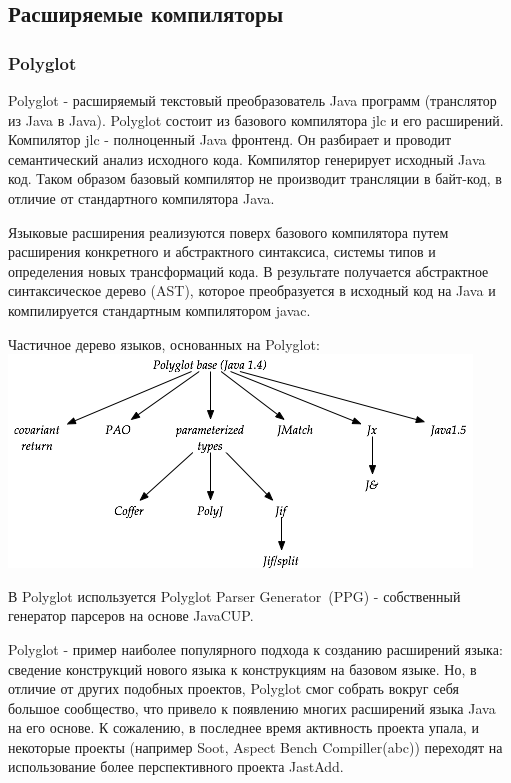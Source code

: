 \documentclass[a4paper,12pt]{article}
\begin{document}
\subsection{Расширяемые компиляторы}
\subsubsection{Polyglot}
Polyglot - расширяемый текстовый преобразователь Java программ (транслятор из
Java в Java). Polyglot состоит из базового компилятора jlc и его расширений.
Компилятор jlc - полноценный Java фронтенд. Он разбирает и проводит
семантический анализ исходного кода. Компилятор генерирует исходный Java код.
Таком образом базовый компилятор не производит трансляции в байт-код, в отличие
от стандартного компилятора Java.

Языковые расширения реализуются поверх базового компилятора путем расширения
конкретного и абстрактного синтаксиса, системы типов и определения новых
трансформаций кода. В результате получается абстрактное синтаксическое дерево
(AST), которое преобразуется в исходный код на Java и компилируется стандартным
компилятором javac.

\begin{center}
Частичное дерево языков, основанных на Polyglot:
 \includegraphics[scale=0.6]{img/polyglot-tree.png}
\end{center}

В Polyglot используется Polyglot Parser Generator~(PPG) - собственный генератор
парсеров на основе JavaCUP.

Polyglot - пример наиболее популярного подхода к созданию расширений языка:
сведение конструкций нового языка к конструкциям на базовом языке. Но, в
отличие от других подобных проектов, Polyglot смог собрать вокруг себя большое
сообщество, что привело к появлению многих расширений языка Java на его основе.
К сожалению, в последнее время активность проекта упала, и некоторые проекты
(например Soot, Aspect Bench Compiller(abc)) переходят на использование более
перспективного проекта JastAdd.
\end{document}
